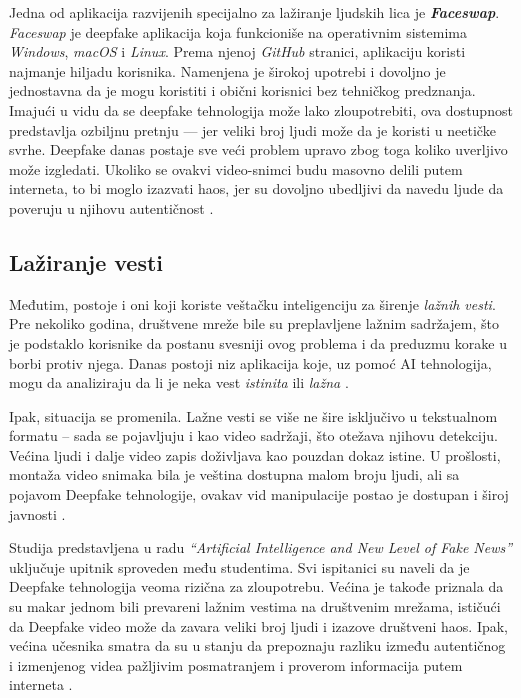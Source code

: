\documentclass[a4paper,12pt]{article}
\begin{document}
Jedna od aplikacija razvijenih specijalno za lažiranje ljudskih lica je \textbf{\textit{Faceswap}}. \textit{Faceswap} je deepfake aplikacija koja funkcioniše na operativnim sistemima \textit{Windows}, \textit{macOS} i \textit{Linux}. Prema njenoj \textit{GitHub} stranici, aplikaciju koristi najmanje hiljadu korisnika. Namenjena je širokoj upotrebi i dovoljno je jednostavna da je mogu koristiti i obični korisnici bez tehničkog predznanja. Imajući u vidu da se deepfake tehnologija može lako zloupotrebiti, ova dostupnost predstavlja ozbiljnu pretnju — jer veliki broj ljudi može da je koristi u neetičke svrhe. Deepfake danas postaje sve veći problem upravo zbog toga koliko uverljivo može izgledati. Ukoliko se ovakvi video-snimci budu masovno delili putem interneta, to bi moglo izazvati haos, jer su dovoljno ubedljivi da navedu ljude da poveruju u njihovu autentičnost \cite{Nazar_2020}. 

\subsection{Lažiranje vesti}
Međutim, postoje i oni koji koriste veštačku inteligenciju za širenje \textit{lažnih vesti}. Pre nekoliko godina, društvene mreže bile su preplavljene lažnim sadržajem, što je podstaklo korisnike da postanu svesniji ovog problema i da preduzmu korake u borbi protiv njega. Danas postoji niz aplikacija koje, uz pomoć AI tehnologija, mogu da analiziraju da li je neka vest \textit{istinita} ili \textit{lažna} \cite{Nazar_2020}. 

Ipak, situacija se promenila. Lažne vesti se više ne šire isključivo u tekstualnom formatu – sada se pojavljuju i kao video sadržaji, što otežava njihovu detekciju. Većina ljudi i dalje video zapis doživljava kao pouzdan dokaz istine. U prošlosti, montaža video snimaka bila je veština dostupna malom broju ljudi, ali sa pojavom Deepfake tehnologije, ovakav vid manipulacije postao je dostupan i široj javnosti \cite{Nazar_2020}. 

Studija predstavljena u radu \textit{"`Artificial Intelligence and New Level of Fake News"'} \cite{Nazar_2020} uključuje upitnik sproveden među studentima. Svi ispitanici su naveli da je Deepfake tehnologija veoma rizična za zloupotrebu. Većina je takođe priznala da su makar jednom bili prevareni lažnim vestima na društvenim mrežama, ističući da Deepfake video može da zavara veliki broj ljudi i izazove društveni haos. Ipak, većina učesnika smatra da su u stanju da prepoznaju razliku između autentičnog i izmenjenog videa pažljivim posmatranjem i proverom informacija putem interneta \cite{Nazar_2020}.
\end{document}
